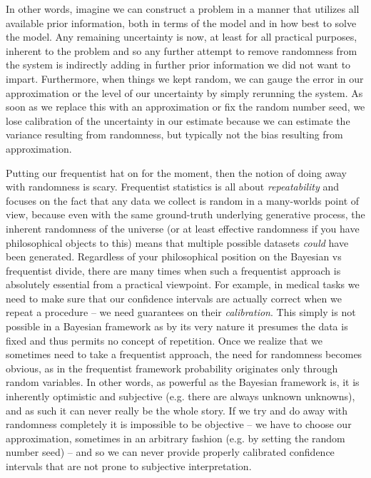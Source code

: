 In other words, imagine we can construct a problem in a manner that utilizes all available prior information,
both in terms of the model and in how best to solve the model.
Any remaining uncertainty is now, at least for all practical purposes, inherent to the problem and so any
further attempt to remove randomness from the system is indirectly adding in further prior information we
did not want to impart.  Furthermore, when things we kept random, we can gauge the error in our approximation
or the level of our uncertainty by simply rerunning the system.  As soon as we replace this with an approximation
or fix the random number seed, we lose calibration of the uncertainty in our estimate because we can estimate the variance
resulting from randomness, but typically not the bias resulting from approximation.

Putting our frequentist hat on for the moment, then the notion of doing away with randomness is scary.
Frequentist statistics is all about \emph{repeatability} and focuses on the fact that any data we collect is random
in a many-worlds point of view,
because even with the same ground-truth underlying generative process, the inherent randomness
of the universe (or at least effective randomness if you have philosophical objects to this) means that multiple possible
datasets \emph{could} have been generated.  Regardless of your philosophical position on the Bayesian vs frequentist divide,
there are many times when such a frequentist approach is absolutely essential from a practical viewpoint.  For example, in medical tasks we need
to make sure that our confidence intervals are actually correct when we repeat a procedure -- we need guarantees on
their \emph{calibration}.  This simply is not possible in a Bayesian framework as by its very nature it presumes the data
is fixed and thus permits no concept of repetition.  Once we realize that we sometimes need to take a frequentist
approach, the need for randomness becomes obvious, as in the frequentist framework probability originates only
through random variables.  In other words, as powerful as the Bayesian framework is, it is inherently optimistic and subjective
(e.g. there are always unknown unknowns), and as such it can never really be the whole story.  If we try and
do away with randomness completely it is impossible to be objective -- we have to choose our approximation, sometimes
in an arbitrary fashion (e.g. by setting the random number seed) -- and so we can never provide properly calibrated confidence 
intervals that are not prone to subjective interpretation.

